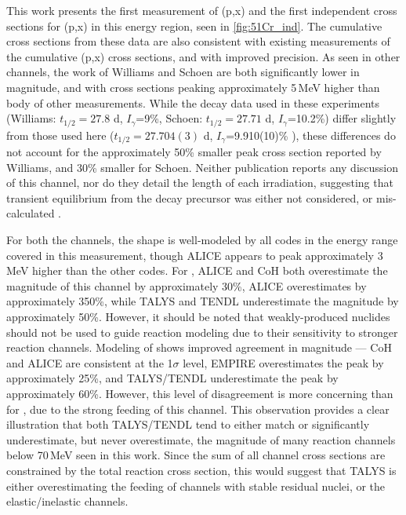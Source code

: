 This work presents the first measurement of (p,x) and  the first independent cross sections for       (p,x) in this energy region, seen in \autoref{fig:51Cr_ind}. 
The cumulative cross sections from these data are also consistent with existing measurements of the cumulative (p,x) cross sections, and with improved precision.
As seen in other channels, the work of Williams and Schoen \cite{PhysRev.162.1055,Schoen1979a} are both significantly lower in magnitude, and with cross sections peaking approximately 5\,MeV higher than body of other measurements. 
While the  decay data used in these experiments (Williams: $t_{1/2}=27.8$ d, $I_\gamma$=9\%, Schoen: $t_{1/2}=27.71$ d, $I_\gamma$=10.2\%) differ slightly from those used here ($t_{1/2}=27.704(3)$ d, $I_\gamma$=9.910(10)\% \cite{Wang2017}), these differences do not account for the approximately 50\% smaller peak cross section reported by Williams, and  30\%  smaller for Schoen. 
Neither publication reports any discussion of this channel, nor do they detail the length of each irradiation,  suggesting that transient equilibrium from the  decay precursor was either not considered, or mis-calculated \cite{Basunia2020}.
 

 
For both the   channels, the shape is well-modeled by all codes in the energy range covered in this measurement, though ALICE appears to peak approximately 3\,MeV higher than the other codes.
For , ALICE and CoH both overestimate the magnitude of this channel by approximately 30\%, ALICE overestimates  by approximately 350\%, while TALYS and TENDL underestimate the magnitude by approximately 50\%.
However, it should be noted that weakly-produced nuclides should not be used to guide reaction modeling due to their sensitivity to stronger reaction channels.
Modeling of  shows improved agreement in magnitude --- CoH and ALICE are consistent at the 1$\sigma$ level, EMPIRE overestimates the peak by approximately 25\%, and TALYS/TENDL underestimate the peak by approximately 60\%.
However, this level of disagreement is more concerning than for , due to the strong feeding of this channel.
This observation provides a clear illustration that both TALYS/TENDL tend to either match or significantly underestimate, but never overestimate, the magnitude of many reaction channels below 70\,MeV seen in this work.
Since the sum of all channel cross sections are constrained by the total reaction cross section, this would suggest that TALYS is either overestimating the feeding of channels with stable residual nuclei, or the elastic/inelastic channels.





